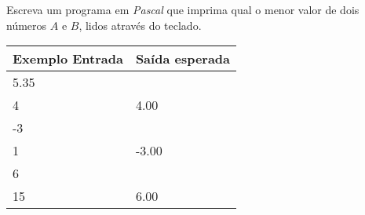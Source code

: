 \item Escreva um programa em \emph{Pascal} que imprima qual o menor valor de 
dois números $A$ e $B$, lidos através do teclado.

\begin{center}
\begin{tabular}{|l|l|} \hline
Exemplo Entrada & Saída esperada \\ \hline
5.35                &                \\
4                & 4.00               \\ \hline
-3                &                \\
1                & -3.00               \\ \hline
6                &                \\ 
15                & 6.00               \\ \hline
\end{tabular}
\end{center}
